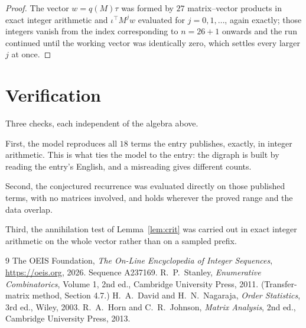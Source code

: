\documentclass[11pt,a4paper]{article}
\theoremstyle{plain}
\theoremstyle{definition}
\begin{document}
\begin{proof}
The vector $w=q(M)\tau$ was formed by $27$ matrix--vector products in exact integer
arithmetic and $\iota^{\!\top}M^{j}w$ evaluated for $j=0,1,\dots$, again exactly; those
integers vanish from the index corresponding to $n=26+1$ onwards and the run continued
until the working vector was identically zero, which settles every larger $j$ at once.
\end{proof}

\section{Verification}

Three checks, each independent of the algebra above.

First, the model reproduces all $18$ terms the entry publishes, exactly, in integer
arithmetic. This is what ties the model to the entry: the digraph is built by reading the
entry's English, and a misreading gives different counts.

Second, the conjectured recurrence was evaluated directly on those published terms, with no
matrices involved, and holds wherever the proved range and the data overlap.

Third, the annihilation test of Lemma~\ref{lem:crit} was carried out in exact integer
arithmetic on the whole vector rather than on a sampled prefix.

\begin{thebibliography}{9}
 The OEIS Foundation, \emph{The On-Line Encyclopedia of Integer
Sequences}, \url{https://oeis.org}, 2026. Sequence A237169.
 R.~P.~Stanley, \emph{Enumerative Combinatorics}, Volume 1, 2nd ed.,
Cambridge University Press, 2011. (Transfer-matrix method, Section 4.7.)
 H.~A.~David and H.~N.~Nagaraja, \emph{Order Statistics}, 3rd ed., Wiley,
2003.
 R.~A.~Horn and C.~R.~Johnson, \emph{Matrix Analysis}, 2nd ed., Cambridge
University Press, 2013.
\end{thebibliography}
\end{document}
